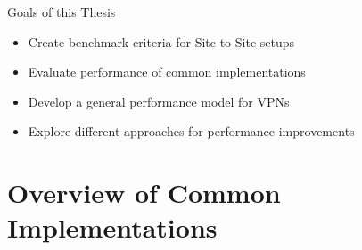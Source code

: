 \documentclass[NET,english]{tumbeamer}
\begin{document}
\begin{frame}{Goals of this Thesis}
	\begin{itemize}
		\item Create benchmark criteria for Site-to-Site setups
		\item Evaluate performance of common implementations
		\item Develop a general performance model for VPNs
		\item Explore different approaches for performance improvements
	\end{itemize}
\end{frame}

\section{Overview of Common Implementations}
\end{document}
